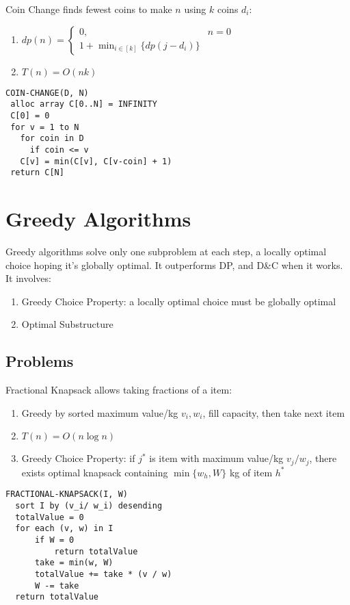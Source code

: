 \documentclass[12pt, a4paper]{article}
\begin{document}
\begin{multicols*}{3}
Coin Change finds fewest coins to make $n$ using $k$ coins $d_i$:
\begin{enumerate}[\roman*.]
  \item $dp(n)=\begin{cases}
        0, &n=0\\
        1 + \min_{i\in[k]}\{dp(j-d_i)\}
      \end{cases}$
  \item $T(n) = O(nk)$
\end{enumerate}
\begin{lstlisting}
COIN-CHANGE(D, N) 
 alloc array C[0..N] = INFINITY
 C[0] = 0
 for v = 1 to N
   for coin in D
     if coin <= v
   C[v] = min(C[v], C[v-coin] + 1)
 return C[N]
\end{lstlisting}

\colbreak


\section{Greedy Algorithms} %
Greedy algorithms solve only one subproblem at each step, a locally optimal choice hoping it's globally optimal. It outperforms DP, and D\&C when it works. It involves:
\begin{enumerate}[\roman*.]
  \item Greedy Choice Property: a locally optimal choice must be globally optimal
  \item Optimal Substructure
\end{enumerate}

\subsection{Problems}

Fractional Knapsack allows taking fractions of a item:
\begin{enumerate}[\roman*.]
  \item Greedy by sorted maximum value/kg $v_i, w_i$, fill capacity, then take next item
  \item $T(n) = O(n \log n)$
  \item Greedy Choice Property: if $j^*$ is item with maximum value/kg $v_j /w_j$, there exists optimal knapsack containing $\min\{w_h, W\}$ kg of item $h^*$
\end{enumerate}
\begin{lstlisting}
FRACTIONAL-KNAPSACK(I, W)
  sort I by (v_i/ w_i) desending
  totalValue = 0
  for each (v, w) in I
      if W = 0
          return totalValue
      take = min(w, W)          
      totalValue += take * (v / w)
      W -= take
  return totalValue
\end{lstlisting}


\end{multicols*}
\end{document}
